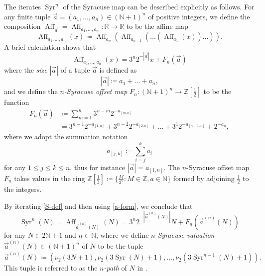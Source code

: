 \documentclass[12pt,a4paper,reqno]{amsart}
\numberwithin{equation}{section}
\theoremstyle{plain}
\theoremstyle{definition}
\newcommand\R{\mathbb{R}}
\newcommand\Z{\mathbb{Z}}
\newcommand\N{\mathbb{N}}
\newcommand\Aff{{\operatorname{Aff}}}
\newcommand\Syr{{\operatorname{Syr}}}
\begin{document}
The iterates $\Syr^n$ of the Syracuse map can be described explicitly as follows.  For any finite tuple $\vec a = (a_1,\dots,a_n) \in (\N+1)^n$ of positive integers, we define the composition $\Aff_{\vec a} = \Aff_{a_1,\dots,a_n}\colon \R \to \R$ to be the affine map
$$ \Aff_{a_1,\dots,a_n}(x) \coloneqq \Aff_{a_n}( \Aff_{a_{n-1}}( \dots (\Aff_{a_1}(x)) \dots )).$$
A brief calculation shows that 
\begin{equation}\label{a-form}
\Aff_{a_1,\dots,a_n}(x) = 3^n 2^{-|\vec a|} x + F_n(\vec a)
\end{equation}
where the \emph{size} $|\vec a|$ of a tuple $\vec a$ is defined as
\begin{equation}\label{length}
 |\vec a| \coloneqq a_1 + \dots + a_n,
\end{equation}
and we define the \emph{$n$-Syracuse offset map} $F_n\colon (\N+1)^n \to \Z[\frac{1}{2}]$ to be the function
\begin{equation}\label{fn-def}
\begin{split}
 F_n(\vec a) &\coloneqq \sum_{m=1}^n 3^{n-m} 2^{-a_{[m,n]}} \\
&= 3^{n-1} 2^{-a_{[1,n]}} + 3^{n-2} 2^{-a_{[2,n]}} + \dots + 3^1 2^{-a_{[n-1,n]}} + 2^{-a_n},
\end{split}
\end{equation}
where we adopt the summation notation
\begin{equation}\label{sum}
a_{[j,k]} \coloneqq \sum_{i=j}^k a_i
\end{equation}
for any $1 \leq j \leq k \leq n$, thus for instance $|\vec a| = a_{[1,n]}$.  The $n$-Syracuse offset map $F_n$ takes values in the ring $\Z[\frac{1}{2}] \coloneqq \{ \frac{M}{2^a}: M \in\Z, a \in \N \}$ formed by adjoining $\frac{1}{2}$ to the integers.   

By iterating \eqref{S-def} and then using \eqref{a-form}, we conclude that
\begin{equation}\label{s-iter}
\Syr^n(N) = \Aff_{\vec a^{(n)}(N)}(N) = 3^n 2^{-|\vec a^{(n)}(N)|} N + F_n(\vec a^{(n)}(N))
\end{equation}
for any $N \in 2\N+1$ and $n \in \N$, where we define \emph{$n$-Syracuse valuation} $\vec a^{(n)}(N) \in (\N+1)^n$ of $N$ to be the tuple
\begin{equation}\label{van}
 \vec a^{(n)}(N) \coloneqq \left(\nu_2(3N+1), \nu_2(3\Syr(N)+1), \dots, \nu_2(3\Syr^{n-1}(N)+1)\right).
\end{equation}
This tuple is referred to as the \emph{$n$-path} of $N$ in \cite{ks}.
\end{document}
